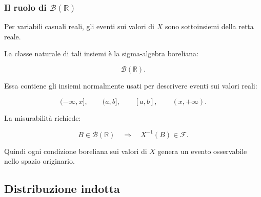 \documentclass[handout]{beamer}%
\providecommand{\F}{\mathcal{F}}
\providecommand{\1}{\mathbf{1}}
\providecommand{\QTR}[2]{\csname #1\endcsname{#2}}
\begin{document}
\begin{frame}%
%

\frametitle{Il ruolo di $\mathcal{B}(\mathbb{R})$}%


Per variabili casuali reali, gli eventi sui valori di $X$ sono sottoinsiemi
della retta reale.

\medskip

La classe naturale di tali insiemi \`{e} la sigma-algebra boreliana:%

\[
\mathcal{B}(\mathbb{R}).
\]


\medskip

Essa contiene gli insiemi normalmente usati per descrivere eventi sui valori reali:%

\[
(-\infty,x], \qquad(a,b], \qquad[a,b], \qquad(x,+\infty).
\]


\medskip

La misurabilit\`{a} richiede:%

\[
B\in\mathcal{B}(\mathbb{R}) \quad\Longrightarrow\quad X^{-1}(B)\in\F.
\]


\medskip

Quindi ogni condizione boreliana sui valori di $X$ genera un evento
osservabile nello spazio originario.%

\transboxout
\end{frame}%




\subsection{Distribuzione indotta}%
\end{document}
